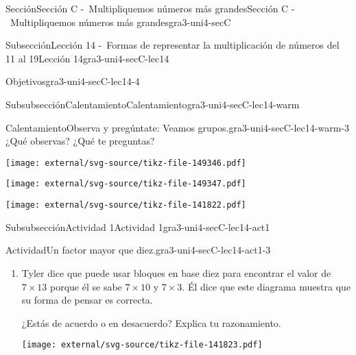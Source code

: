 \documentclass[twoside,10pt,]{article}
\begin{document}
\begin{sectionptx}{Sección}{Sección C -~Multipliquemos números más grandes}{}{Sección C -~Multipliquemos números más grandes}{}{}{gra3-uni4-secC}
\begin{subsectionptx}{Subsección}{Lección 14 -~Formas de representar la multiplicación de números del 11 al 19}{}{Lección 14}{}{}{gra3-uni4-secC-lec14}
\begin{objectives}{Objetivos}{gra3-uni4-secC-lec14-4}
\begin{itemize}[label=\textbullet]
\end{itemize}
\end{objectives}
%
%
\typeout{************************************************}
\typeout{************************************************}
%
\begin{subsubsectionptx}{Subsubsección}{Calentamiento}{}{Calentamiento}{}{}{gra3-uni4-secC-lec14-warm}
\begin{exploration}{Calentamiento}{Observa y pregúntate: Veamos grupos.}{gra3-uni4-secC-lec14-warm-3}%
¿Qué observas? ¿Qué te preguntas?%
\begin{sidebyside}{3}{0}{0}{0}%
\begin{sbspanel}{0.333333333333333}%
\texttt{[image: external/svg-source/tikz-file-149346.pdf]}
\end{sbspanel}%
\begin{sbspanel}{0.333333333333333}%
\texttt{[image: external/svg-source/tikz-file-149347.pdf]}
\end{sbspanel}%
\begin{sbspanel}{0.333333333333333}%
\texttt{[image: external/svg-source/tikz-file-141822.pdf]}
\end{sbspanel}%
\end{sidebyside}%
\end{exploration}%
\end{subsubsectionptx}
%
%
\typeout{************************************************}
\typeout{************************************************}
%
\begin{subsubsectionptx}{Subsubsección}{Actividad 1}{}{Actividad 1}{}{}{gra3-uni4-secC-lec14-act1}
\begin{activity}{Actividad}{Un factor mayor que diez.}{gra3-uni4-secC-lec14-act1-3}%
%
\begin{enumerate}
\item{}Tyler dice que puede usar bloques en base diez para encontrar el valor de \(7\times 13\) porque él se sabe \(7\times 10\) y \(7\times 3\). Él dice que este diagrama muestra que su forma de pensar es correcta.%
\begin{sidebyside}{2}{0}{0.05}{0.05}%
\begin{sbspanel}{0.5}%
¿Estás de acuerdo o en desacuerdo? Explica tu razonamiento.%
\end{sbspanel}%
\begin{sbspanel}{0.4}%
\texttt{[image: external/svg-source/tikz-file-141823.pdf]}

\end{sbspanel}
\end{sidebyside}
\end{enumerate}
\end{activity}
\end{subsubsectionptx}
\end{subsectionptx}
\end{sectionptx}
\end{document}
